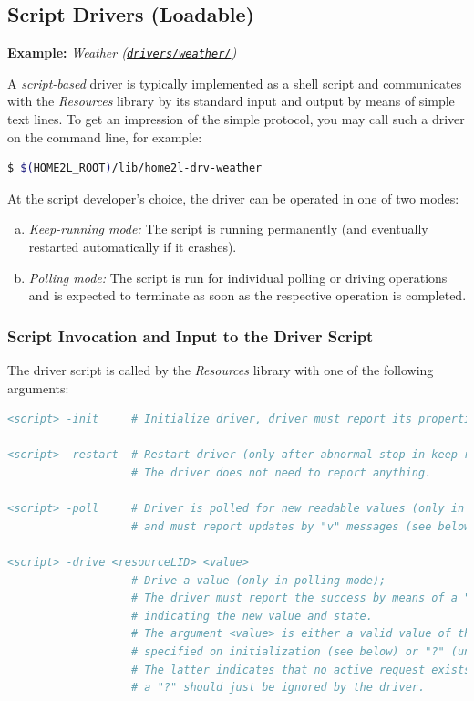 \documentclass[12pt,english,parskip=half,headheight=19pt]{scrreprt}
\newcommand{\refsrc}[1]{\href{#1}{\texttt{#1}}}     %
\begin{document}
\subsection{Script Drivers (Loadable)}
\label{sec:resources-drvdev-external}


\textbf{Example:} \textit{Weather (\refsrc{drivers/weather/})}

A \textit{script-based} driver is typically implemented as a shell script
and communicates with the \textit{Resources} library by its standard input
and output by means of simple text lines. To get an impression of the
simple protocol, you may call such a driver on the command line, for example:
\begin{lstlisting}[language=bash]
  $ $(HOME2L_ROOT)/lib/home2l-drv-weather
\end{lstlisting}

At the script developer's choice, the driver can be operated in one of
two modes:

\begin{enumerate}[a)]

\item
  \textit{Keep-running mode:} The script is running permanently (and
  eventually restarted automatically if it crashes).

\item
  \textit{Polling mode:} The script is run for individual polling or driving operations and
  is expected to terminate as soon as the respective operation is completed.

\end{enumerate}


\subsubsection*{Script Invocation and Input to the Driver Script}

The driver script is called by the \textit{Resources} library with one of the following arguments:
\begin{lstlisting}[language=comments]
<script> -init     # Initialize driver, driver must report its properties (see below).

<script> -restart  # Restart driver (only after abnormal stop in keep-running mode);
                   # The driver does not need to report anything.

<script> -poll     # Driver is polled for new readable values (only in polling mode)
                   # and must report updates by "v" messages (see below).

<script> -drive <resourceLID> <value>
                   # Drive a value (only in polling mode);
                   # The driver must report the success by means of a "v" message
                   # indicating the new value and state.
                   # The argument <value> is either a valid value of the resource type
                   # specified on initialization (see below) or "?" (unknown).
                   # The latter indicates that no active request exists. In most cases,
                   # a "?" should just be ignored by the driver.
\end{lstlisting}
\end{document}
